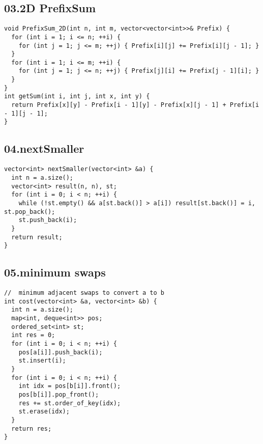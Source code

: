 \documentclass[twoside]{article}
\begin{document}
\begin{multicols*}{2}
\begin{verbatim}
\end{verbatim}

{
\subsection*{03.2D PrefixSum}
}
\begin{verbatim}
void PrefixSum_2D(int n, int m, vector<vector<int>>& Prefix) {
  for (int i = 1; i <= n; ++i) {
    for (int j = 1; j <= m; ++j) { Prefix[i][j] += Prefix[i][j - 1]; }
  }
  for (int i = 1; i <= m; ++i) {
    for (int j = 1; j <= n; ++j) { Prefix[j][i] += Prefix[j - 1][i]; }
  }
}
int getSum(int i, int j, int x, int y) {
  return Prefix[x][y] - Prefix[i - 1][y] - Prefix[x][j - 1] + Prefix[i - 1][j - 1];
}

\end{verbatim}

{
\subsection*{04.nextSmaller}
}
\begin{verbatim}
vector<int> nextSmaller(vector<int> &a) {
  int n = a.size();
  vector<int> result(n, n), st;
  for (int i = 0; i < n; ++i) {
    while (!st.empty() && a[st.back()] > a[i]) result[st.back()] = i, st.pop_back();
    st.push_back(i);
  }
  return result;
}
\end{verbatim}

{
\subsection*{05.minimum swaps}
}
\begin{verbatim}
//  minimum adjacent swaps to convert a to b
int cost(vector<int> &a, vector<int> &b) {
  int n = a.size();
  map<int, deque<int>> pos;
  ordered_set<int> st;
  int res = 0;
  for (int i = 0; i < n; ++i) {
    pos[a[i]].push_back(i);
    st.insert(i);
  }
  for (int i = 0; i < n; ++i) {
    int idx = pos[b[i]].front();
    pos[b[i]].pop_front();
    res += st.order_of_key(idx);
    st.erase(idx);
  }
  return res;
}
\end{verbatim}


\end{multicols*}
\end{document}
